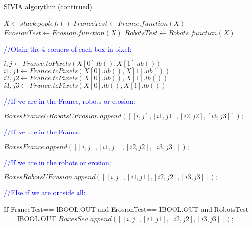 \documentclass[a4paper,12pt]{report}
\begin{document}
\begin{algorithm}
  \caption{SIVIA algorythm (continued)}
  \begin{algorithmic}
  
	
		\vspace{0.3 cm}
	
  		\State $X\gets stack.popleft()$
		\State $FranceTest\gets France.function(X)$
		\State $ErosionTest\gets Erosion.function(X)$ 
		\State $RobotsTest\gets Robots.function(X)$

		\vspace{0.3 cm}

  		\textcolor{blue}{//Otain the 4 corners of each box in pixel:}\
  		 
  		
  		\State $i,j\gets France.toPixels(X[0].lb(),X[1].ub())$
		\State $i1,j1\gets France.toPixels(X[0].ub(),X[1].ub())$
		\State $i2,j2\gets France.toPixels(X[0].ub(),X[1].lb())$ 
		\State $i3,j3\gets France.toPixels(X[0].lb(),X[1].lb())$
  
		\vspace{0.3 cm}
		
	 	\textcolor{blue}{//If we are in the France, robots or erosion:}\
	 	

     		\State $BoxesFranceURobotsUErosion.append([[i,j],[i1,j1],[i2,j2],[i3,j3]]);$
     		
     		\vspace{0.3 cm}
     	
     	\textcolor{blue}{//If we are in the France:}\
	 	 
     		\State $BoxesFrance.append([[i,j],[i1,j1],[i2,j2],[i3,j3]]);$
	 	\EndIf
	 	
	 	\vspace{0.3 cm}
	 	
	 	\textcolor{blue}{//If we are in the robots or erosion:}\
	 	 
     		\State $BoxesRobotsUErosion.append([[i,j],[i1,j1],[i2,j2],[i3,j3]]);$
	 	 
	
	 	 \EndIf
	 	 
	 	 \vspace{0.3 cm}
     		
     	

     	
     	\textcolor{blue}{//Else if we are outside all:}\
     
	 	 
	 	 \ElsIf If{ FranceTest== IBOOL.OUT and  ErosionTest== IBOOL.OUT and RobotsTest == IBOOL.OUT}
	 	 \State $BoxesSea.append([[i,j],[i1,j1],[i2,j2],[i3,j3]]);$
	 	 

\end{algorithmic}
\end{algorithm}
\end{document}
